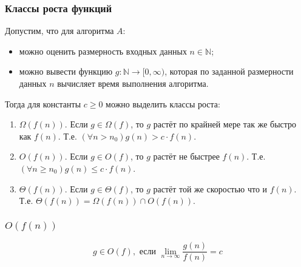 \begin{frame}
    \frametitle{Классы роста функций}
    
    Допустим, что для алгоритма $A$:
    \begin{itemize}
        \item можно оценить размерность входных данных $n\in\mathbb{N}$;
        \item можно вывести функцию $g:\mathbb{N}\to[0,\infty)$, которая по заданной размерности данных $n$ вычисляет время выполнения алгоритма.
    \end{itemize}
    
    Тогда для константы $c\geq 0$ можно выделить классы роста:
    \begin{enumerate}
        \item $\Omega(f(n))$. Если $g\in\Omega(f)$, то $g$ растёт \alert{по крайней мере так же быстро} как $f(n)$. Т.е. $(\forall n>n_0) g(n)>c\cdot f(n)$.
        
        \item $O(f(n))$. Если $g\in O(f)$, то $g$ растёт \alert{не быстрее} $f(n)$. Т.е. $(\forall n\geq n_0) g(n)\leq c\cdot f(n)$.

        \item $\Theta(f(n))$. Если $g\in \Theta(f)$, то $g$ растёт \alert{той же скоростью} что и $f(n)$. Т.е. $\Theta(f(n))=\Omega(f(n))\cap O(f(n))$.
    \end{enumerate}
\end{frame}

\begin{frame}
    \frametitle{$O(f(n))$}
    
    \[
        g\in O(f),\text{ если } \lim_{n\to\infty}\frac{g(n)}{f(n)}=c
    \]
\end{frame}


